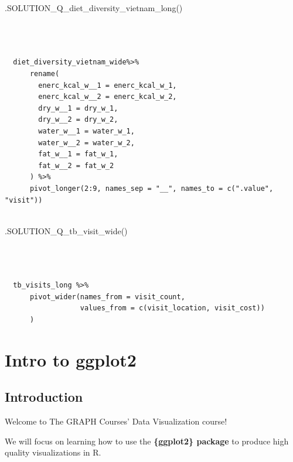 \documentclass[
  letterpaper,
  DIV=11,
  numbers=noendperiod]{scrreprt}
\newenvironment{Shaded}{\begin{snugshade}}{\end{snugshade}}
\newcommand{\FunctionTok}[1]{\textcolor[rgb]{0.28,0.35,0.67}{#1}}
\newcommand{\NormalTok}[1]{\textcolor[rgb]{0.00,0.23,0.31}{#1}}
\begin{document}
\begin{Shaded}
\begin{Highlighting}[]
\FunctionTok{.SOLUTION\_Q\_diet\_diversity\_vietnam\_long}\NormalTok{()}
\end{Highlighting}
\end{Shaded}

\begin{verbatim}


  
  diet_diversity_vietnam_wide%>%
      rename(
        enerc_kcal_w__1 = enerc_kcal_w_1,
        enerc_kcal_w__2 = enerc_kcal_w_2,
        dry_w__1 = dry_w_1,
        dry_w__2 = dry_w_2,
        water_w__1 = water_w_1,
        water_w__2 = water_w_2,
        fat_w__1 = fat_w_1,
        fat_w__2 = fat_w_2
      ) %>%  
      pivot_longer(2:9, names_sep = "__", names_to = c(".value", "visit"))
  
\end{verbatim}

\begin{Shaded}
\begin{Highlighting}[]
\FunctionTok{.SOLUTION\_Q\_tb\_visit\_wide}\NormalTok{()}
\end{Highlighting}
\end{Shaded}

\begin{verbatim}


  
  tb_visits_long %>%
      pivot_wider(names_from = visit_count,
                  values_from = c(visit_location, visit_cost))
      )
\end{verbatim}


\hypertarget{intro-to-ggplot2}{%
\chapter{Intro to ggplot2}\label{intro-to-ggplot2}}

\hypertarget{introduction-13}{%
\section{Introduction}\label{introduction-13}}

Welcome to The GRAPH Courses' Data Visualization course!

We will focus on learning how to use the \textbf{\{ggplot2\} package} to
produce high quality visualizations in R.
\end{document}
